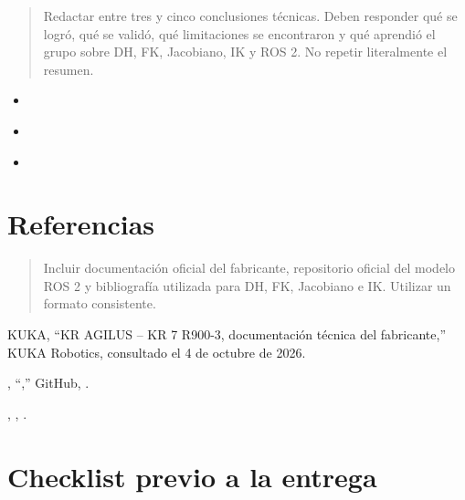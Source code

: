 \documentclass[journal]{IEEEtran}
\newcommand{\instr}[1]{%
\begin{quote}
\small
\noindent\textbf{\color{blue}{INSTRUCCIÓN:}} #1
\end{quote}
}
\newcommand{\pendiente}[1]{\textbf{\color{red}{[#1]}}}
\begin{document}
\instr{Redactar entre tres y cinco conclusiones técnicas. Deben responder qué se logró, qué se validó, qué limitaciones se encontraron y qué aprendió el grupo sobre DH, FK, Jacobiano, IK y ROS 2. No repetir literalmente el resumen.}

\begin{itemize}
    \item \pendiente{Conclusión 1.}
    \item \pendiente{Conclusión 2.}
    \item \pendiente{Conclusión 3.}
\end{itemize}

\section{Referencias}

\instr{Incluir documentación oficial del fabricante, repositorio oficial del modelo ROS 2 y bibliografía utilizada para DH, FK, Jacobiano e IK. Utilizar un formato consistente.}

\begin{thebibliography}{00}

KUKA,
``KR AGILUS -- KR 7 R900-3, documentación técnica del fabricante,''
KUKA Robotics, consultado el 4 de octubre de 2026.

\pendiente{Organización},
``\pendiente{Repositorio ROS 2 oficial o utilizado},''
GitHub, \pendiente{URL y commit/tag utilizado}.

\pendiente{Autor},
\textit{\pendiente{Título del libro o recurso de robótica}},
\pendiente{Editorial/año}.

\end{thebibliography}

\appendices

\section{Checklist previo a la entrega}
\end{document}

